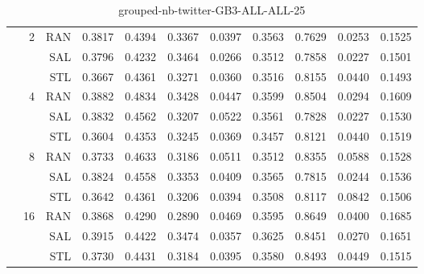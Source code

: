 \begin{center}
\begin{table}[htbp]
\begin{tabular}{ | r | r | r | r | r | r | r | r | r | r | r |}
 & \multirow{3}{*}{2} & RAN & 0.3817 & 0.4394 & 0.3367 & 0.0397 & 0.3563 & 0.7629 & 0.0253 & 0.1525\\ \cline{3-11}
 &   & SAL & 0.3796 & 0.4232 & 0.3464 & 0.0266 & 0.3512 & 0.7858 & 0.0227 & 0.1501\\ \cline{3-11}
 &   & STL & 0.3667 & 0.4361 & 0.3271 & 0.0360 & 0.3516 & 0.8155 & 0.0440 & 0.1493\\ \cline{2-11}
 & \multirow{3}{*}{4} & RAN & 0.3882 & 0.4834 & 0.3428 & 0.0447 & 0.3599 & 0.8504 & 0.0294 & 0.1609\\ \cline{3-11}
 &   & SAL & 0.3832 & 0.4562 & 0.3207 & 0.0522 & 0.3561 & 0.7828 & 0.0227 & 0.1530\\ \cline{3-11}
 &   & STL & 0.3604 & 0.4353 & 0.3245 & 0.0369 & 0.3457 & 0.8121 & 0.0440 & 0.1519\\ \cline{2-11}
 & \multirow{3}{*}{8} & RAN & 0.3733 & 0.4633 & 0.3186 & 0.0511 & 0.3512 & 0.8355 & 0.0588 & 0.1528\\ \cline{3-11}
 &   & SAL & 0.3824 & 0.4558 & 0.3353 & 0.0409 & 0.3565 & 0.7815 & 0.0244 & 0.1536\\ \cline{3-11}
 &   & STL & 0.3642 & 0.4361 & 0.3206 & 0.0394 & 0.3508 & 0.8117 & 0.0842 & 0.1506\\ \cline{2-11}
 & \multirow{3}{*}{16} & RAN & 0.3868 & 0.4290 & 0.2890 & 0.0469 & 0.3595 & 0.8649 & 0.0400 & 0.1685\\ \cline{3-11}
 &   & SAL & 0.3915 & 0.4422 & 0.3474 & 0.0357 & 0.3625 & 0.8451 & 0.0270 & 0.1651\\ \cline{3-11}
 &   & STL & 0.3730 & 0.4431 & 0.3184 & 0.0395 & 0.3580 & 0.8493 & 0.0449 & 0.1515\\ \cline{2-11}
\hline
\end{tabular}
\caption{grouped-nb-twitter-GB3-ALL-ALL-25}
\end{table}
\end{center}

